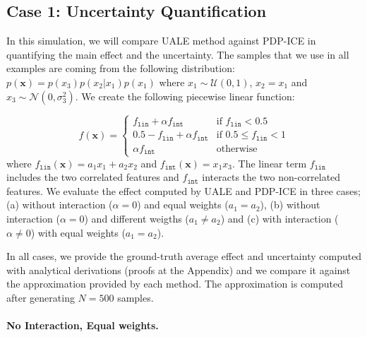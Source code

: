 \documentclass[twoside]{article}
\begin{document}
\subsection{Case 1: Uncertainty Quantification}
\label{sec:simulation-examples-1}

In this simulation, we will compare UALE method against PDP-ICE in
quantifying the main effect and the uncertainty. The samples that we
use in all examples are coming from the following distribution:
\(p(\mathbf{x}) = p(x_3)p(x_2|x_1)p(x_1)\) where
\(x_1 \sim \mathcal{U}(0,1)\), \(x_2 = x_1\) and
\(x_3 \sim \mathcal{N}(0, \sigma_3^2)\). We create the following
piecewise linear function:


\begin{equation}
  \label{eq:synth-ex-1-function}
  f(\mathbf{x}) = \begin{cases}
                    f_{\mathtt{lin}} + \alpha f_{\mathtt{int}} & \text{if $f_{\mathtt{lin}} < 0.5$ }\\
                    0.5 - f_{\mathtt{lin}} + \alpha f_{\mathtt{int}} & \text{if $0.5 \leq f_{\mathtt{lin}} < 1$}\\
                    \alpha f_{\mathtt{int}} &\text{otherwise}
                  \end{cases}
\end{equation}
%
where \(f_{\mathtt{lin}}(\mathbf{x}) = a_1 x_1 + a_2 x_2\) and
\(f_{\mathtt{int}}(\mathbf{x}) = x_1x_3\). The linear term
\(f_{\mathtt{lin}}\) includes the two correlated features and
\(f_{\mathtt{int}}\) interacts the two non-correlated features.  We
evaluate the effect computed by UALE and PDP-ICE in three cases; (a)
without interaction (\(\alpha=0\)) and equal weights (\(a_1=a_2\)),
(b) without interaction (\(\alpha=0\)) and different weigths
(\( a_1 \neq a_2 \)) and (c) with interaction (\(\alpha \neq 0\)) with
equal weights (\(a_1=a_2\)).

In all cases, we provide the ground-truth average effect and
uncertainty computed with analytical derivations (proofs at the
Appendix) and we compare it against the approximation provided by each
method. The approximation is computed after generating \(N=500\)
samples.

\paragraph{No Interaction, Equal weights.}
\end{document}
